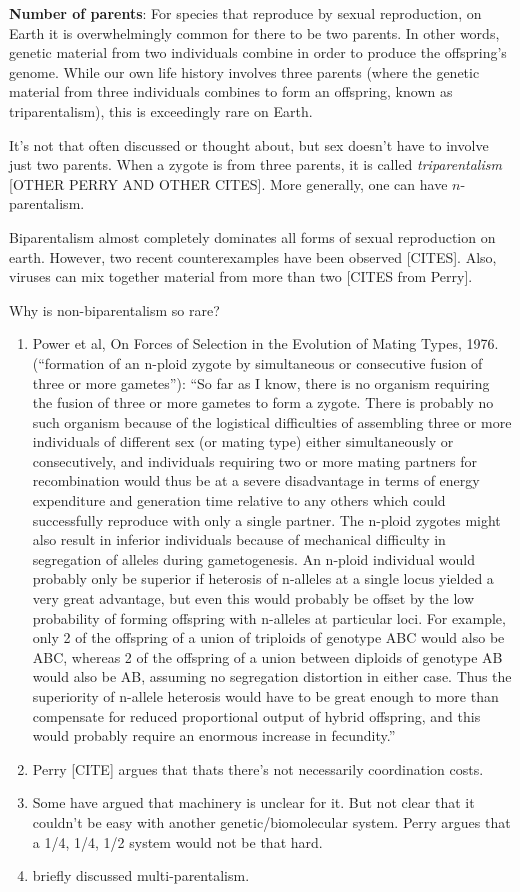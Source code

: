 \textbf{Number of parents}: For species that reproduce by sexual reproduction, on Earth it is overwhelmingly common for there to be two parents. In other words, genetic material from two individuals combine in order to produce the offspring's genome. While our own life history involves three parents (where the genetic material from three individuals combines to form an offspring, known as triparentalism), this is exceedingly rare on Earth. 

It's not that often discussed or thought about, but sex doesn't have to involve just two parents.  When a zygote is from three parents, it is called \emph{triparentalism}  [OTHER PERRY AND OTHER CITES].  More generally, one can have $n$-parentalism.

Biparentalism almost completely dominates all forms of sexual reproduction on earth.  However, two recent counterexamples have been observed [CITES].  Also, viruses can mix together material from more than two [CITES from Perry].  


Why is non-biparentalism so rare?
\begin{enumerate}
\item Power et al, On Forces of Selection in the Evolution of Mating Types, 1976.~\cite{power_forces_1976} (``formation of an n-ploid zygote by simultaneous or consecutive fusion of three or more gametes''): ``So far as I know, there is no organism requiring the fusion of three or more gametes to form a zygote. There is probably no such organism because of the logistical difficulties of assembling three or more individuals of different sex (or mating type) either simultaneously or consecutively, and individuals requiring two or more mating partners for recombination would thus be at a severe disadvantage in terms of energy expenditure and generation time relative to any others which could successfully reproduce with only a single partner. The n-ploid zygotes might also result in inferior individuals because of mechanical difficulty in segregation of alleles during gametogenesis. An n-ploid individual would probably only be superior if heterosis of n-alleles at a single locus yielded a very great advantage, but even this would probably be offset by the low probability of forming offspring with n-alleles at particular loci. For example, only 2 of the offspring of a union of triploids of genotype ABC would also be ABC, whereas 2 of the offspring of a union between diploids of genotype AB would also be AB, assuming no segregation distortion in either case. Thus the superiority of n-allele heterosis would have to be great enough to more than compensate for reduced proportional output of hybrid offspring, and this would probably require an enormous increase in fecundity.''
\item Perry [CITE] argues that thats there's not necessarily coordination costs.
\item Some have argued that machinery is unclear for it. But not clear that it couldn't be easy with another genetic/biomolecular system.  Perry argues that a 1/4, 1/4, 1/2 system would not be that hard.
\item \cite{hurst_why_1996} briefly discussed multi-parentalism.
\end{enumerate}

